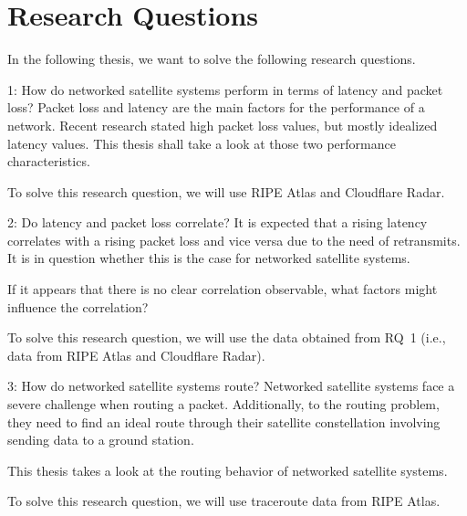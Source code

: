 \section{Research Questions} \label{sec:research-questions}

In the following thesis, we want to solve the following research questions.


\begin{rqbox}{1: How do networked satellite systems perform in terms of latency
		and packet loss?}
	Packet loss and latency are the main factors for the performance of a
	network. Recent research stated high packet loss values, but mostly
	idealized latency values. This thesis shall take a look at those two
	performance characteristics.

	To solve this research question, we will use RIPE Atlas and Cloudflare
	Radar.
\end{rqbox}

\begin{rqbox}{2: Do latency and packet loss correlate?}
	It is expected that a rising latency correlates with a rising packet
	loss and vice versa due to the need of retransmits.
	It is in question whether this is the case for networked satellite
	systems.

	If it appears that there is no clear correlation observable, what
	factors might influence the correlation?

	To solve this research question, we will use the data obtained from
	RQ~1 (i.e., data from RIPE Atlas and Cloudflare Radar).
\end{rqbox}

\begin{rqbox}{3: How do networked satellite systems route?}
	Networked satellite systems face a severe challenge when routing a
	packet.
	Additionally, to the routing problem, they need to find an ideal route
	through their satellite constellation involving sending data to a
	ground station.

	This thesis takes a look at the routing behavior of networked satellite
	systems.

	To solve this research question, we will use traceroute data from RIPE
	Atlas.
\end{rqbox}
